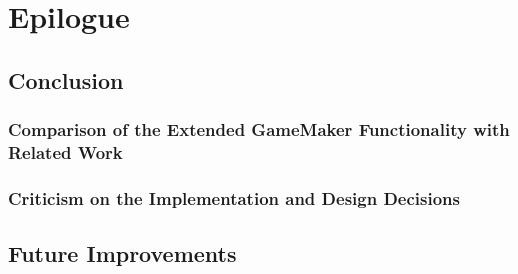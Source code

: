 \documentclass[bsc,frontabs,twoside,singlespacing,parskip,deptreport]{infthesis}     %
\begin{document}
\chapter{Epilogue}
\section{Conclusion}
\subsection{Comparison of the Extended GameMaker Functionality with Related Work}
\subsection{Criticism on the Implementation and Design Decisions}

\section{Future Improvements}








\end{document}
